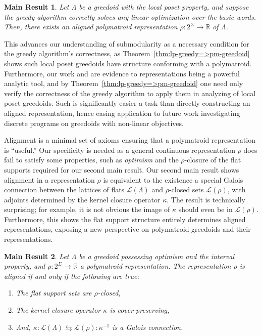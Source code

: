 \documentclass[11pt]{article}
\newtheorem{mresult}{Main Result}
\newcommand{\univ}{\Sigma}
\newcommand{\glang}{\Lambda}
\providecommand{\L}{}
\renewcommand{\L}{\mathscr{L}}
\begin{document}
\begin{mresult}\label{mr:lp-greedy=>pm-greedoid}
    Let $\glang$ be a greedoid with the local poset property,
    and suppose the greedy algorithm correctly solves any linear optimization over the basic words.
    Then, there exists an aligned polymatroid representation $\rho:2^\univ\to\mathbb{R}$ of $\glang$.
\end{mresult}

This advances our understanding of submodularity as a necessary condition for the greedy algorithm's correctness, as Theorem~\ref{thm:lp-greedy=>pm-greedoid} shows such local poset greedoids have structure conforming with a polymatroid.
Furthermore, our work and \cite{korte1985polymatroid} are evidence to representations being a powerful analytic tool, and by Theorem~\ref{thm:lp-greedy=>pm-greedoid} one need only verify the correctness of the greedy algorithm to apply them in analyzing of local poset greedoids.
Such is significantly easier a task than directly constructing an aligned representation, hence easing application to future work investigating discrete programs on greedoids with non-linear objectives.

Alignment is a minimal set of axioms ensuring that a polymatroid representation is ``useful.''
Our specificity is needed as a general continuous representation $\rho$ does fail to satisfy some properties, such as \emph{optimism} and the $\rho$-closure of the flat supports required for our second main result. 
Our second main result shows alignment in a representation $\rho$ is equivalent to the existence a special Galois connection between the lattices of flats $\L(\glang)$ and $\rho$-closed sets $\L(\rho)$, with adjoints determined by the kernel closure operator $\kappa$.
The result is technically surprising; for example, it is not obvious the image of $\kappa$ should even be in $\L(\rho)$.
Furthermore, this shows the flat support structure entirely determines aligned representations, exposing a new perspective on polymatroid greedoids and their representations.

\begin{mresult}\label{mr:gc}
    Let $\glang$ be a greedoid possessing optimism and the interval property, and $\rho:2^\univ\to\mathbb{R}$ a polymatroid representation.
    The representation $\rho$ is aligned if and only if the following are true:
    \begin{enumerate}
        \item The flat support sets are $\rho$-closed,
        \item The kernel closure operator $\kappa$ is cover-preserving,
        \item And, $\kappa:\L(\glang)\leftrightarrows\L(\rho):\kappa^{-1}$ is a Galois connection.
    \end{enumerate}
\end{mresult}
\end{document}
